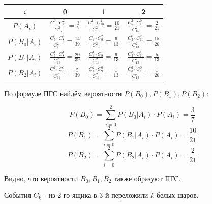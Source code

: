 \begin{table}[h]
	\centering\makegapedcells
	\begin{tabular}{|c|c|c|c|}
		\hline
		$i$          & 0                                                      & 1                                                       & 2                                                       \\ \hline
		$P(A_i)$     & $\frac{C_5^0 \cdot C_{10}^2}{C_{15}^2} = \frac{3}{7}$  & $\frac{C_5^1 \cdot C_{10}^1}{C_{15}^2} = \frac{10}{21}$ & $\frac{C_5^2 \cdot C_{10}^0}{C_{15}^2} = \frac{2}{21}$  \\ \hline
		$P(B_0|A_i)$ & $\frac{C_5^0 \cdot C_{8}^2}{C_{13}^2} = \frac{14}{39}$ & $\frac{C_4^0 \cdot C_{9}^2}{C_{13}^2} = \frac{6}{13}$   & $\frac{C_3^0 \cdot C_{10}^2}{C_{13}^2} = \frac{15}{26}$ \\ \hline
		$P(B_1|A_i)$ & $\frac{C_5^1 \cdot C_{8}^1}{C_{13}^2} = \frac{20}{39}$ & $\frac{C_4^1 \cdot C_{9}^1}{C_{13}^2} = \frac{6}{13}$   & $\frac{C_3^1 \cdot C_{10}^1}{C_{13}^2} = \frac{5}{13}$  \\ \hline
		$P(B_2|A_i)$ & $\frac{C_5^2 \cdot C_{8}^0}{C_{13}^2} = \frac{5}{39}$  & $\frac{C_4^2 \cdot C_{9}^0}{C_{13}^2} = \frac{1}{13}$   & $\frac{C_3^2 \cdot C_{10}^0}{C_{13}^2} = \frac{1}{26}$  \\ \hline
	\end{tabular}
\end{table}

По формуле ПГС найдём вероятности $P(B_0), P(B_1), P(B_2)$:

\[ P(B_0) = \sum_{i=0}^{2} P(B_0|A_i) \cdot P(A_i) = \dfrac{3}{7} \]
\[ P(B_1) = \sum_{i=0}^{2} P(B_1|A_i) \cdot P(A_i) = \dfrac{10}{21} \]
\[ P(B_2) = \sum_{i=0}^{2} P(B_2|A_i) \cdot P(A_i) = \dfrac{2}{21} \]

Видно, что вероятности $B_0, B_1, B_2$ также образуют ПГС.

События $C_k$ - из 2-го ящика в 3-й переложили $k$ белых шаров.

